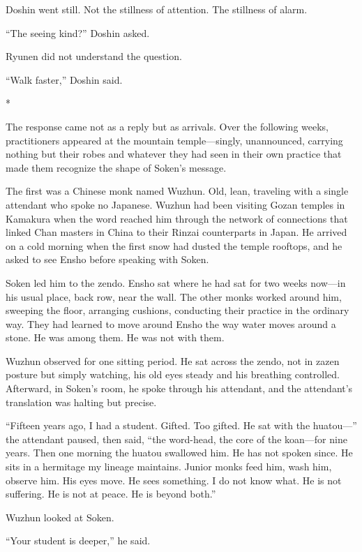 Doshin went still. Not the stillness of attention. The stillness of alarm.

``The seeing kind?'' Doshin asked.

Ryunen did not understand the question.

``Walk faster,'' Doshin said.

\begin{center}
*\quad*\quad*
\end{center}

The response came not as a reply but as arrivals. Over the following weeks, practitioners appeared at the mountain temple---singly, unannounced, carrying nothing but their robes and whatever they had seen in their own practice that made them recognize the shape of Soken's message.

The first was a Chinese monk named Wuzhun. Old, lean, traveling with a single attendant who spoke no Japanese. Wuzhun had been visiting Gozan temples in Kamakura when the word reached him through the network of connections that linked Chan masters in China to their Rinzai counterparts in Japan. He arrived on a cold morning when the first snow had dusted the temple rooftops, and he asked to see Ensho before speaking with Soken.

Soken led him to the zendo. Ensho sat where he had sat for two weeks now---in his usual place, back row, near the wall. The other monks worked around him, sweeping the floor, arranging cushions, conducting their practice in the ordinary way. They had learned to move around Ensho the way water moves around a stone. He was among them. He was not with them.

Wuzhun observed for one sitting period. He sat across the zendo, not in zazen posture but simply watching, his old eyes steady and his breathing controlled. Afterward, in Soken's room, he spoke through his attendant, and the attendant's translation was halting but precise.

``Fifteen years ago, I had a student. Gifted. Too gifted. He sat with the huatou---'' the attendant paused, then said, ``the word-head, the core of the koan---for nine years. Then one morning the huatou swallowed him. He has not spoken since. He sits in a hermitage my lineage maintains. Junior monks feed him, wash him, observe him. His eyes move. He sees something. I do not know what. He is not suffering. He is not at peace. He is beyond both.''

Wuzhun looked at Soken.

``Your student is deeper,'' he said.

